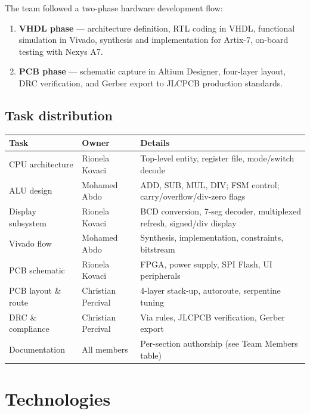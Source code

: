 \documentclass[11pt,a4paper]{article}
\begin{document}
The team followed a two-phase hardware development flow:

\begin{enumerate}[leftmargin=2em]
  \item \textbf{VHDL phase} — architecture definition, RTL coding in VHDL,
        functional simulation in Vivado, synthesis and implementation for
        Artix-7, on-board testing with Nexys A7.
  \item \textbf{PCB phase} — schematic capture in Altium Designer, four-layer
        layout, DRC verification, and Gerber export to JLCPCB production
        standards.
\end{enumerate}

\subsection{Task distribution}

\begin{center}
\begin{tabularx}{\linewidth}{L{3.2cm}L{3cm}L{7.5cm}}
  \toprule
  \textbf{Task} & \textbf{Owner} & \textbf{Details} \\
  \midrule
  CPU architecture    & Rionela Kovaci    & Top-level entity, register file, mode/switch decode \\
  ALU design          & Mohamed Abdo      & ADD, SUB, MUL, DIV; FSM control; carry/overflow/div-zero flags \\
  Display subsystem   & Rionela Kovaci    & BCD conversion, 7-seg decoder, multiplexed refresh, signed/div display \\
  Vivado flow         & Mohamed Abdo      & Synthesis, implementation, constraints, bitstream \\
  PCB schematic       & Rionela Kovaci    & FPGA, power supply, SPI Flash, UI peripherals \\
  PCB layout \& route & Christian Percival & 4-layer stack-up, autoroute, serpentine tuning \\
  DRC \& compliance   & Christian Percival & Via rules, JLCPCB verification, Gerber export \\
  Documentation       & All members       & Per-section authorship (see Team Members table) \\
  \bottomrule
\end{tabularx}
\end{center}

\section{Technologies}
\end{document}
